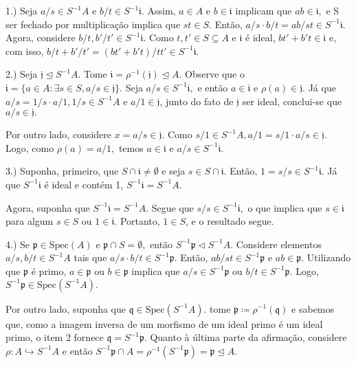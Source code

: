 \documentclass[algebraII_notes.tex]{subfiles}
\begin{document}
\begin{proof*}
	1.) Seja \(a/s\in S^{-1}A\) e \(b/t\in S^{-1}\mathfrak{i}.\) Assim, \(a\in A\) e \(b\in \mathfrak{i}\) implicam
	que \(ab\in \mathfrak{i},\) e S ser fechado por multiplicação implica que \(st\in S.\) Então, \(a/s \cdot b/t = ab/st\in S^{-1}\mathfrak{i}.\)
	Agora, considere \(b/t, b'/t'\in S^{-1}\mathfrak{i}.\) Como \(t, t'\in S\subseteq A\) e \(\mathfrak{i}\) é ideal, \(bt'+b't\in \mathfrak{i}\) e,
	com isso, \(b/t + b'/t' = (bt'+b't)/t t'\in S^{-1}\mathfrak{i}.\)

	2.) Seja \(\mathfrak{j}\trianglelefteq{S^{-1}A}.\) Tome \(\mathfrak{i} = \rho^{-1}(\mathfrak{j})\trianglelefteq{A}.\) Observe que o
	\(\mathfrak{i} = \{a\in A:\exists s\in S, a/s\in \mathfrak{j}\}\). Seja \(a/s\in S^{-1}\mathfrak{i},\) e então
	\(a\in \mathfrak{i}\) e \(\rho (a)\in \mathfrak{j}.\) Já que \(a/s = 1/s \cdot a/1, 1/s\in S^{-1}A\) e \(a/1\in \mathfrak{j}\),
	junto do fato de \(\mathfrak{j}\) ser ideal, conclui-se que \(a/s\in \mathfrak{j}.\)

	Por outro lado, considere \(x=a/s\in \mathfrak{j}.\) Como \(s/1\in S^{-1}A, a/1 = s/1 \cdot a/s\in \mathfrak{j}.\) Logo,
	como \(\rho (a) = a/1,\) temos \(a\in \mathfrak{i}\) e \(a/s\in S^{-1}\mathfrak{i}.\)

	3.) Suponha, primeiro, que \(S\cap \mathfrak{i} \neq\emptyset\) e seja \(s\in S\cap \mathfrak{i}.\) Então,
	\(1 = s/s\in S^{-1}\mathfrak{i}.\) Já que \(S^{-1}\mathfrak{i}\) é ideal e contém 1, \(S^{-1}\mathfrak{i} = S^{-1}A.\)

	Agora, suponha que \(S^{-1}\mathfrak{i} = S^{-1}A.\) Segue que \(s/s\in S^{-1}\mathfrak{i},\) o que implica que \(s\in \mathfrak{i}\) para algum
	\(s\in S\) ou \(1\in \mathfrak{i}.\) Portanto, \(1\in S\), e o resultado segue.

	4.) Se \(\mathfrak{p}\in \mathrm{Spec}(A)\) e \(\mathfrak{p}\cap S = \emptyset,\) então \(S^{-1}\mathfrak{p}\vartriangleleft S^{-1}A.\)
	Considere elementos \(a/s, b/t\in S^{-1}A\) tais que \(a/s \cdot b/t\in S^{-1}\mathfrak{p}.\) Então, \(ab/st\in S^{-1}\mathfrak{p}\) e \(ab\in \mathfrak{p}.\)
	Utilizando que \(\mathfrak{p}\) é primo, \(a\in \mathfrak{p}\) ou \(b\in \mathfrak{p}\) implica que \(a/s\in S^{-1}\mathfrak{p}\) ou \(b/t\in S^{-1}\mathfrak{p}.\)
	Logo, \(S^{-1}\mathfrak{p}\in \mathrm{Spec}(S^{-1}A).\)

	Por outro lado, suponha que \(\mathfrak{q}\in \mathrm{Spec}(S^{-1}A).\) tome \(\mathfrak{p}\coloneqq \rho^{-1}(\mathfrak{q})\) e
	sabemos que, como a imagem inversa de um morfismo de um ideal primo é um ideal primo, o item 2 fornece \(\mathfrak{q} = S^{-1}\mathfrak{p}.\)
	Quanto à última parte da afirmação, considere \(\rho :A\hookrightarrow S^{-1}A\) e então \(S^{-1}\mathfrak{p}\cap A = \rho^{-1}(S^{-1}\mathfrak{p}) = \mathfrak{p} \trianglelefteq{A}.\) \qedsymbol
\end{proof*}
\end{document}
